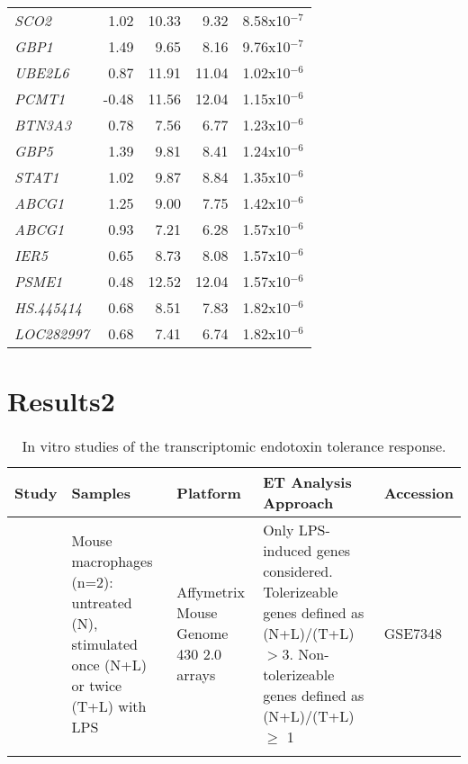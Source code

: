 \begin{center}
\begin{longtable}[h]{ l r r r r }
\textit{SCO2} & 1.02 & 10.33 & 9.32 & 8.58x10$^{-7}$ \\
\textit{GBP1} & 1.49 & 9.65 & 8.16 & 9.76x10$^{-7}$ \\
\textit{UBE2L6} & 0.87 & 11.91 & 11.04 & 1.02x10$^{-6}$ \\
\textit{PCMT1} & -0.48 & 11.56 & 12.04 & 1.15x10$^{-6}$ \\
\textit{BTN3A3} & 0.78 & 7.56 & 6.77 & 1.23x10$^{-6}$ \\
\textit{GBP5} & 1.39 & 9.81 & 8.41 & 1.24x10$^{-6}$ \\
\textit{STAT1} & 1.02 & 9.87 & 8.84 & 1.35x10$^{-6}$ \\
\textit{ABCG1} & 1.25 & 9.00 & 7.75 & 1.42x10$^{-6}$ \\
\textit{ABCG1} & 0.93 & 7.21 & 6.28 & 1.57x10$^{-6}$ \\
\textit{IER5} & 0.65 & 8.73 & 8.08 & 1.57x10$^{-6}$ \\
\textit{PSME1} & 0.48 & 12.52 & 12.04 & 1.57x10$^{-6}$ \\
\textit{HS.445414} & 0.68 & 8.51 & 7.83 & 1.82x10$^{-6}$ \\
\textit{LOC282997} & 0.68 & 7.41 & 6.74 & 1.82x10$^{-6}$ \\
\end{longtable}
\bigskip

\chapter{Results2}
\label{app:Results2}

\begin{landscape}
\begin{center}
\begin{longtable}[ht]{p{.15\textheight} p{.40\textheight} p{.20\textheight} p{.60\textheight} p{.10\textheight}}
\caption{In vitro studies of the transcriptomic endotoxin tolerance response.}
\label{tab:ETDatasets}\\
\toprule
Study & Samples & Platform & ET Analysis Approach & Accession \\
\midrule
\textcite{Foster2007} & Mouse macrophages (n=2): untreated (N), stimulated once (N+L) or twice (T+L) with LPS & Affymetrix Mouse Genome 430 2.0 arrays & Only LPS-induced genes considered. Tolerizeable genes defined as (N+L)/(T+L) $>$3. Non-tolerizeable genes defined as (N+L)/(T+L) $\geq$ 1 & GSE7348 \\

& & & & \\


\end{longtable}
\end{center}
\end{landscape}
\end{center}
